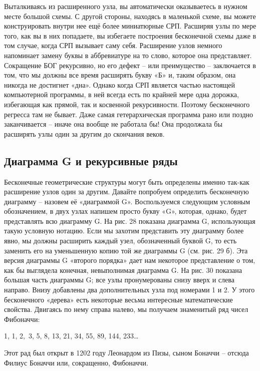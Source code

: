 \documentclass[../main.tex]{subfiles}
\begin{document}
Выталкиваясь из расширенного узла, вы автоматически оказываетесь в нужном месте большой схемы. С другой стороны, находясь в маленькой схеме, вы можете конструировать внутри нее ещё более миниатюрные СРП\@. Расширяя узлы по мере того, как вы в них попадаете, вы избегаете построения бесконечной схемы даже в том случае, когда СРП вызывает саму себя. Расширение узлов немного напоминает замену буквы в аббревиатуре на то слово, которое она представляет. Сокращение БОГ рекурсивно, но его дефект \--- или преимущество \--- заключается в том, что мы должны все время расширять букву «Б» и, таким образом, она никогда не достигнет «дна». Однако когда СРП является частью настоящей компьютерной программы, в ней всегда есть по крайней мере одна дорожка, избегающая как прямой, так и косвенной рекурсивности. Поэтому бесконечного регресса там не бывает. Даже самая гетерархическая программа рано или поздно заканчивается \--- иначе она вообще не работала бы! Она продолжала бы расширять узлы один за другим до скончания веков.


\subsection{Диаграмма G и рекурсивные ряды}

Бесконечные геометрические структуры могут быть определены именно так-как расширение узлов один за другим. Давайте попробуем определить бесконечную диаграмму \--- назовем её «диаграммой G». Воспользуемся следующим условным обозначением, в двух узлах напишем просто букву «G», которая, однако, будет представлять всю диаграмму G. На рис. 28 показана диаграмма G, использующая такую условную нотацию. Если мы захотим представить эту диаграмму более явно, мы должны расширить каждый узел, обозначенный буквой G, то есть заменить его на уменьшенную копию той же диаграммы G (см. рис. 29 б). Эта версия диаграммы G «второго порядка» дает нам некоторое представление о том, как бы выглядела конечная, невыполнимая диаграмма G. На рис. 30 показана большая часть диаграммы G; все узлы пронумерованы снизу вверх и слева направо. Внизу добавлены два дополнительных узла под номерами 1 и 2. У этого бесконечного «дерева» есть некоторые весьма интересные математические свойства. Двигаясь по нему справа налево, мы получаем знаменитый ряд чисел Фибоначчи:

1, 1, 2,~3, 5, 8, 13, 21, 34, 55, 89, 144, 233\ldots{}

Этот рад был открыт в 1202 году Леонардом из Пизы, сыном Боначчи \--- отсюда Филиус Боначчи или, сокращенно, Фибоначчи.
\end{document}
